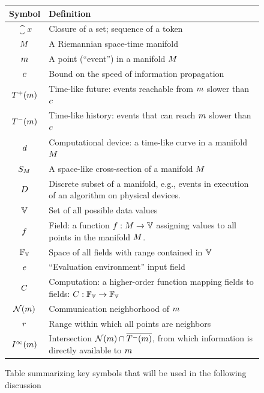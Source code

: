 \documentclass[12pt,a4paper,twoside,openright]{book}
\begin{document}
\begin{figure}
\centering
\begin{tabular}{|cp{}|}
\hline
Symbol & Definition \\
\hline
$\closure{x}$             & Closure of a set; sequence of a token \\
\hline %
$M$               & A Riemannian space-time manifold \\
$m$                  & A point (``event'') in a manifold $M$ \\
$c$              & Bound on the speed of information propagation \\
$T^+({m})$       & Time-like future: events reachable from $m$ slower than $c$\\
$T^-({m})$         & Time-like history: events that can reach $m$ slower than $c$ \\
$d$                 & Computational device: a time-like curve in a manifold $M$ \\
$S_{M}$   & A space-like cross-section of a manifold $M$\\
$D$            & Discrete subset of a manifold, e.g., events in execution of an algorithm on physical devices.\\
\hline %
$\spaceof{\datavalue}$    & Set of all possible data values \\
$f$                  & Field: a function $\field: \manifold \rightarrow \spaceof{\datavalue}$ assigning values to all points in the manifold $M$. \\
$\fieldsof{\spaceof{\datavalue}}$ & Space of all fields with range contained in $\spaceof{\datavalue}$ \\
$e$            & ``Evaluation environment'' input field \\
$C$            & Computation: a higher-order function mapping fields to fields: $\computation: \fieldsof{\spaceof{\datavalue}} \rightarrow \fieldsof{\spaceof{\datavalue}}$ \\
\hline
$\mathcal{N}(m)$         & Communication neighborhood of $m$ \\
$r$             & Range within which all points are neighbors \\
$I^\infty(m)$     & Intersection $\mathcal{N}(m) \cap \overline{T^-({m})}$, from which information is directly available to $m$\\
\hline
\end{tabular}
\caption{Table summarizing key symbols that will be used in the following discussion}
\label{f:symbols}
\end{figure}
\end{document}
